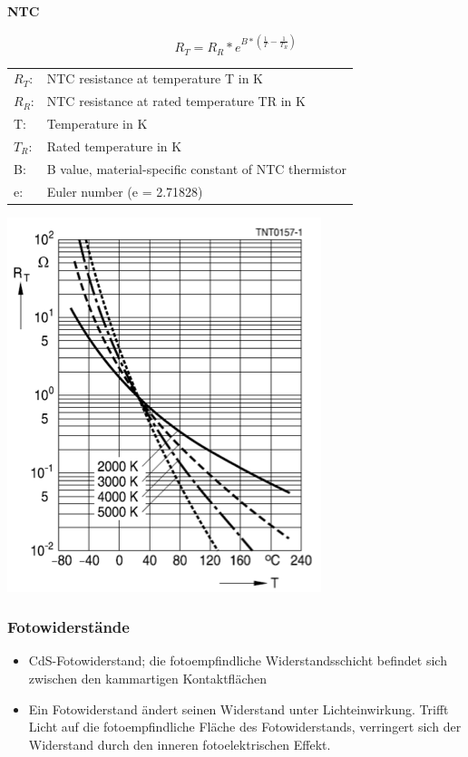 \textbf{NTC}\\
\begin{minipage}{9cm}
\begin{equation}
R_{T}=R_{R}*e^{B*(\frac{1}{T}-\frac{1}{T_{R}})}
\end{equation}
\begin{tabular}{ll}
  $R_{T}$: &NTC resistance at temperature T in K\\
  $R_{R}$: &NTC resistance at rated temperature TR in K\\
  T: &Temperature in K\\
  $T_{R}$: &Rated temperature in K\\
  B: &B value, material-specific constant of NTC thermistor\\
  e: &Euler number (e = 2.71828)
\end{tabular}
\end{minipage}
\begin{minipage}{9cm}
\includegraphics[scale=0.5]{pictures/ntc}
\end{minipage}

\subsubsection{Fotowiderstände}
\begin{itemize}
  \item CdS-Fotowiderstand; die fotoempfindliche Widerstandsschicht befindet
  sich zwischen den kammartigen Kontaktflächen
  \item Ein Fotowiderstand ändert seinen Widerstand unter Lichteinwirkung.
  Trifft Licht auf die fotoempfindliche Fläche des Fotowiderstands, verringert
  sich der Widerstand durch den inneren fotoelektrischen Effekt.
\end{itemize}

